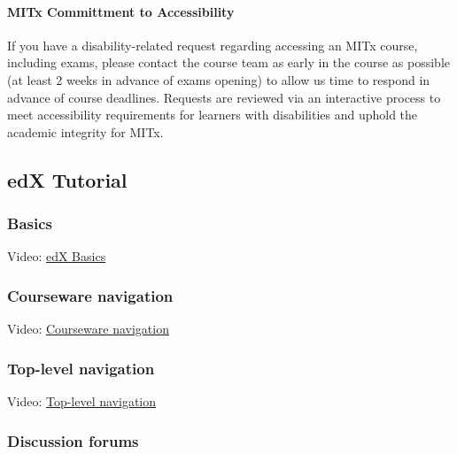 \documentclass[pdftex, brazil, 12pt, twoside]{article}
\begin{document}
\paragraph{MITx Committment to Accessibility} If you have a disability-related
request regarding accessing an MITx course, including exams, please contact the course
team as early in the course as possible (at least 2 weeks in advance of exams opening)
to allow us time to respond in advance of course deadlines. Requests are reviewed
via an interactive process to meet accessibility requirements for learners with
disabilities and uphold the academic integrity for MITx.


\subsection{edX Tutorial}
\label{ovw0-edx}

\subsubsection{Basics}
\label{ovw0-edx-basics}

Video: \href{https://www.youtube.com/watch?v=OEoXaMPEzfM}{edX Basics}

\subsubsection{Courseware navigation}
\label{ovw0-edx-navigation}

Video: \href{https://www.youtube.com/watch?v=7m8pab1MfYY}{Courseware navigation}

\subsubsection{Top-level navigation}
\label{ovw0-edx-top-nav}

Video: \href{https://www.youtube.com/watch?v=pflzzK47wEo}{Top-level navigation}

\subsubsection{Discussion forums}
\label{ovw0-edx-forum}
\end{document}
